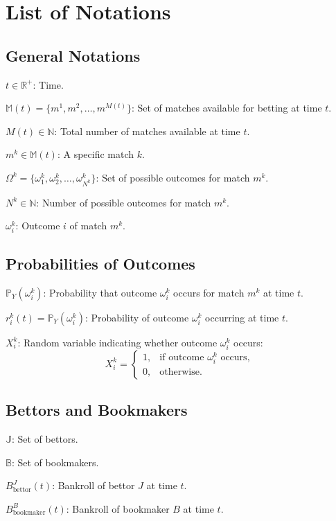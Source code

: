 \chapter{List of Notations}
\label{appendix:list_of_notations}

\section{General Notations}

\item \( t \in \mathbb{R}^+ \): Time.
\item \( \mathbb{M}(t) = \{ m^1, m^2, \dots, m^{M(t)} \} \): Set of matches available for betting at time \( t \).
\item \( M(t) \in \mathbb{N} \): Total number of matches available at time \( t \).
\item \( m^k \in \mathbb{M}(t) \): A specific match \( k \).
\item \( \Omega^k = \{ \omega_1^k, \omega_2^k, \dots, \omega_{N^k}^k \} \): Set of possible outcomes for match \( m^k \).
\item \( N^k \in \mathbb{N} \): Number of possible outcomes for match \( m^k \).
\item \( \omega_i^k \): Outcome \( i \) of match \( m^k \).

\section{Probabilities of Outcomes}

\item \( \mathbb{P}_Y( \omega_i^k ) \): Probability that outcome \( \omega_i^k \) occurs for match \( m^k \) at time \( t \).
\item \( r_i^k(t) = \mathbb{P}_Y( \omega_i^k ) \): Probability of outcome \( \omega_i^k \) occurring at time \( t \).
\item \( X_i^k \): Random variable indicating whether outcome \( \omega_i^k \) occurs:
  \[
  X_i^k = \begin{cases}
  1, & \text{if outcome } \omega_i^k \text{ occurs}, \\
  0, & \text{otherwise}.
  \end{cases}
  \]

\section{Bettors and Bookmakers}

\item \( \mathbb{J} \): Set of bettors.
\item \( \mathbb{B} \): Set of bookmakers.
\item \( B_{\text{bettor}}^J(t) \): Bankroll of bettor \( J \) at time \( t \).
\item \( B_{\text{bookmaker}}^B(t) \): Bankroll of bookmaker \( B \) at time \( t \).

